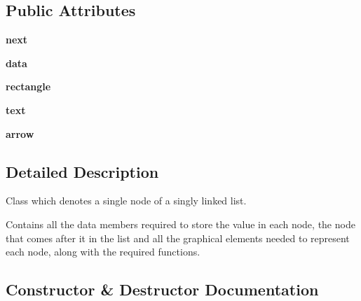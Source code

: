 \subsection*{Public Attributes}
\begin{DoxyCompactItemize}
\item 
\mbox{\label{class_singly_linked_list_1_1_singly_linked_list_node_a4dafb60af09bd5be70622ab7e9eeb743}} 
{\bfseries next}
\item 
\mbox{\label{class_singly_linked_list_1_1_singly_linked_list_node_a4ecec4767ec2df1e1985683f8986bdf2}} 
{\bfseries data}
\item 
\mbox{\label{class_singly_linked_list_1_1_singly_linked_list_node_a90f38d27b040c3c09460bbfbac48463e}} 
{\bfseries rectangle}
\item 
\mbox{\label{class_singly_linked_list_1_1_singly_linked_list_node_a322a731f88a73f394b4b775eac6acef6}} 
{\bfseries text}
\item 
\mbox{\label{class_singly_linked_list_1_1_singly_linked_list_node_afc27fef68ee2fd5b4a25b8ff4368e12c}} 
{\bfseries arrow}
\end{DoxyCompactItemize}


\subsection{Detailed Description}
Class which denotes a single node of a singly linked list. 

Contains all the data members required to store the value in each node, the node that comes after it in the list and all the graphical elements needed to represent each node, along with the required functions. 

\subsection{Constructor \& Destructor Documentation}
\mbox{\label{class_singly_linked_list_1_1_singly_linked_list_node_a7dc5e943f0780eb94e10a3e127e9981e}} 
